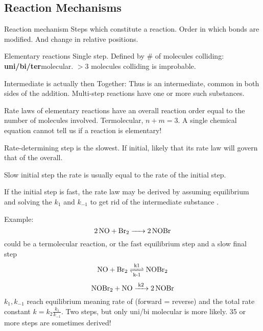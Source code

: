 \begin{mdframed}\subsection{Reaction Mechanisms}
\begin{multicols}{2}
\begin{compactdesc}
    \item[Reaction mechanism] Steps which constitute a reaction.
        Order in which bonds are modified. And change in relative positions.
    \item[Elementary reactions] Single step. Defined by \# of molecules
        colliding: \textbf{uni/bi/ter}molecular.
        $>3$ molecules colliding is improbable.
    \item[Intermediate]
         is actually
         then 
        Together: 
        Thus  is an intermediate, common in both sides of the addition.
        Multi-step reactions have one or more such substances.
    \item[Rate laws] of elementary reactions have an overall reaction order
        equal to the number of molecules involved. Termolecular, $n + m = 3$.
        A single chemical equation cannot tell us if a reaction is elementary!
    \item[Rate-determining step] is the slowest. If initial, likely that its
        rate law will govern that of the overall.
    \item[Slow initial step] the rate is usually equal to the rate of the
        initial step.
\end{compactdesc}

If the initial step is fast, the rate law may be derived by assuming
equilibrium and solving the $k_1$ and $k_{-1}$ to get rid of the intermediate
substance .

Example: \[\ce{2NO + Br2 -> 2NOBr}\] could be a termolecular reaction, or
the fast equilibrium step and a slow final step
\[\ce{NO + Br2 <=>T[k1][k-1] NOBr2}\]
\[\ce{NOBr2 + NO ->T[k2] 2NOBr}\]
$k_1, k_{-1}$ reach
equilibrium meaning rate of (forward = reverse) and the total rate constant
$k = k_2 \frac{k_1}{k_{-1}}$. Two steps, but only uni/bi molecular is more likely.
35 or more steps are sometimes derived!
\end{multicols}
\end{mdframed}



